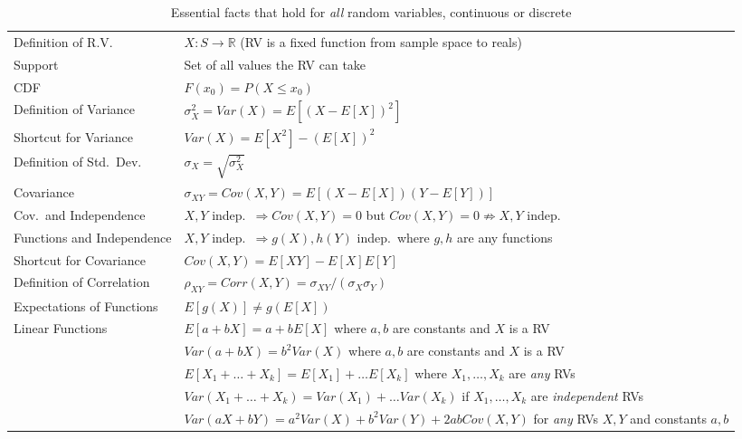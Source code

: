 \documentclass[12pt]{article}
\begin{document}
\begin{sidewaystable}
\centering
\begin{tabular}{l|l}
\hline
Definition of R.V.\ & $X\colon S \rightarrow \mathbb{R}$ (RV is a fixed function from sample space to reals) \\
Support& Set of all values the RV can take\\
CDF & $F(x_0) = P(X\leq x_0)$\\
Definition of Variance&$\sigma_X^2 = Var(X) = E\left[\left(X - E[X]\right)^2 \right]$\\
Shortcut for Variance&$Var(X) = E[X^2] - \left(E[X]\right)^2$\\
Definition of Std.\ Dev.\ &$\sigma_X = \sqrt{\sigma_X^2}$\\
Covariance&$\sigma_{XY} = Cov(X,Y) = E\left[\left(X - E[X]\right)\left(Y - E[Y]\right)\right]$\\
	Cov.\ and Independence&$X,Y$ indep.\ $\Rightarrow Cov(X,Y) = 0$ but $Cov(X,Y)=0 \nRightarrow X,Y$ indep.\\
	Functions and Independence& $X,Y$ indep.\ $\Rightarrow g(X), h(Y)$ indep.\ where $g,h$ are any functions\\
Shortcut for Covariance&$Cov(X,Y) = E[XY] - E[X]E[Y]$\\
Definition of Correlation & $\rho_{XY} = Corr(X,Y) = \sigma_{XY}/(\sigma_X \sigma_Y)$ \\
Expectations of Functions& $E[g(X)] \neq g\left( E[X]\right)$\\
Linear Functions & $E[a + bX] = a + b E[X]$ where $a,b$ are constants and $X$ is a RV\\
&  $Var(a+bX) = b^2 Var(X)$  where $a,b$ are constants and $X$ is a RV \\
& $E[X_1 + \hdots + X_k] = E[X_1] + \hdots E[X_k]$ where $X_1, \hdots, X_k$ are \emph{any} RVs\\
& $Var(X_1 + \hdots + X_k) = Var(X_1) + \hdots Var(X_k)$ if $X_1, \hdots, X_k$ are \emph{independent} RVs\\
&$Var(aX + bY) = a^2 Var(X) + b^2 Var(Y) + 2ab Cov(X,Y)$ for \emph{any} RVs $X,Y$ and constants $a,b$\\
\hline
\end{tabular}
\caption{Essential facts that hold for \emph{all} random variables, continuous or discrete}
\end{sidewaystable}
\end{document}
